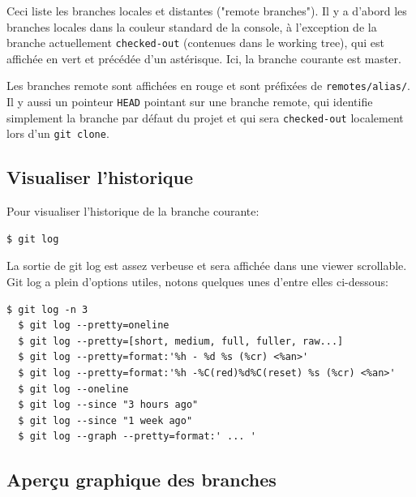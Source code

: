 \documentclass{../../common/tufte-latex/tufte-handout}
\begin{document}
Ceci liste les branches locales et distantes ("remote branches").
Il y a d'abord les branches locales dans la couleur standard de la console, à l'exception de la branche actuellement \texttt{checked-out} (contenues dans le working tree), qui est affichée en vert et précédée d'un astérisque. 
Ici, la branche courante est master.

Les branches remote sont affichées en rouge et sont préfixées de \texttt{remotes/alias/}.
Il y aussi un pointeur \texttt{HEAD} pointant sur une branche remote, qui identifie simplement la branche par défaut du projet et qui sera \texttt{checked-out} localement lors d'un \texttt{git clone}.

\subsection{Visualiser l'historique}

Pour visualiser l'historique de la branche courante:

\begin{lstlisting}[style=BashInputStyle]
  $ git log
\end{lstlisting}

La sortie de git log est assez verbeuse et sera affichée dans une viewer scrollable.
Git log a plein d'options utiles, notons quelques unes d'entre elles ci-dessous:

\begin{lstlisting}[style=BashInputStyle]
  $ git log -n 3
  $ git log --pretty=oneline
  $ git log --pretty=[short, medium, full, fuller, raw...]
  $ git log --pretty=format:'%h - %d %s (%cr) <%an>'
  $ git log --pretty=format:'%h -%C(red)%d%C(reset) %s (%cr) <%an>'
  $ git log --oneline
  $ git log --since "3 hours ago"
  $ git log --since "1 week ago"
  $ git log --graph --pretty=format:' ... '
\end{lstlisting}

\subsection{Aperçu graphique des branches}
\end{document}

